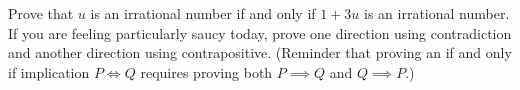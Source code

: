 Prove that $u$ is an irrational number if and only if $1 + 3u$ is an irrational number. If you are feeling particularly saucy today, prove one direction using contradiction and another direction using contrapositive. (Reminder that proving an if and only if implication $P \iff Q$ requires proving both $P \implies Q$ and $Q \implies P$.)